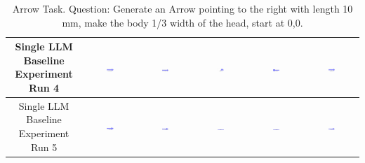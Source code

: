 \begin{table}[H]
\begin{tabular}{|c|c|c|c|c|c|}
    \hline
    Single LLM Baseline Experiment Run 4 & \includegraphics[width=0.15\textwidth]{./run_4/png/gpt-4o_results/Arrow.png} & \includegraphics[width=0.15\textwidth]{./run_4/png/claude-3-5-sonnet-20240620_results/Arrow.png} & \includegraphics[width=0.15\textwidth]{./run_4/png/watsonx_meta-llama_llama-3-1-70b-instruct_results/Arrow.png} & \includegraphics[width=0.15\textwidth]{./run_4/png/watsonx_meta-llama_llama-3-405b-instruct_results/Arrow.png} & \includegraphics[width=0.15\textwidth]{./run_4/png/o1-preview_results/Arrow.png} \\
    \hline
    Single LLM Baseline Experiment Run 5 & \includegraphics[width=0.15\textwidth]{./run_5/png/gpt-4o_results/Arrow.png} & \includegraphics[width=0.15\textwidth]{./run_5/png/claude-3-5-sonnet-20240620_results/Arrow.png} & \includegraphics[width=0.15\textwidth]{./run_5/png/watsonx_meta-llama_llama-3-1-70b-instruct_results/Arrow.png} & \includegraphics[width=0.15\textwidth]{./run_5/png/watsonx_meta-llama_llama-3-405b-instruct_results/Arrow.png} & \includegraphics[width=0.15\textwidth]{./run_5/png/o1-preview_results/Arrow.png} \\
    \hline
    \end{tabular}
    \caption{Arrow Task. Question: Generate an Arrow pointing to the right with length 10 mm, make the body 1/3 width of the head, start at 0,0.}
\end{table}

